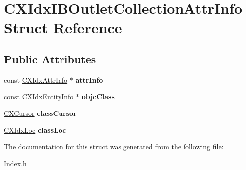 \hypertarget{structCXIdxIBOutletCollectionAttrInfo}{}\section{C\+X\+Idx\+I\+B\+Outlet\+Collection\+Attr\+Info Struct Reference}
\label{structCXIdxIBOutletCollectionAttrInfo}
\subsection*{Public Attributes}
\begin{DoxyCompactItemize}
\item 
\mbox{\label{structCXIdxIBOutletCollectionAttrInfo_a03b81a7206b7339593b59e9b5044c6cf}} 
const \mbox{\hyperlink{structCXIdxAttrInfo}{C\+X\+Idx\+Attr\+Info}} $\ast$ {\bfseries attr\+Info}
\item 
\mbox{\label{structCXIdxIBOutletCollectionAttrInfo_a3af28f98bf03069265b829cd061b8cd4}} 
const \mbox{\hyperlink{structCXIdxEntityInfo}{C\+X\+Idx\+Entity\+Info}} $\ast$ {\bfseries objc\+Class}
\item 
\mbox{\label{structCXIdxIBOutletCollectionAttrInfo_a36ed5b7b2b3eb286d8028df4b62ceba8}} 
\mbox{\hyperlink{structCXCursor}{C\+X\+Cursor}} {\bfseries class\+Cursor}
\item 
\mbox{\label{structCXIdxIBOutletCollectionAttrInfo_add423b2700a97c915a1b316c4e674005}} 
\mbox{\hyperlink{structCXIdxLoc}{C\+X\+Idx\+Loc}} {\bfseries class\+Loc}
\end{DoxyCompactItemize}


The documentation for this struct was generated from the following file\+:\begin{DoxyCompactItemize}
\item 
Index.\+h\end{DoxyCompactItemize}
